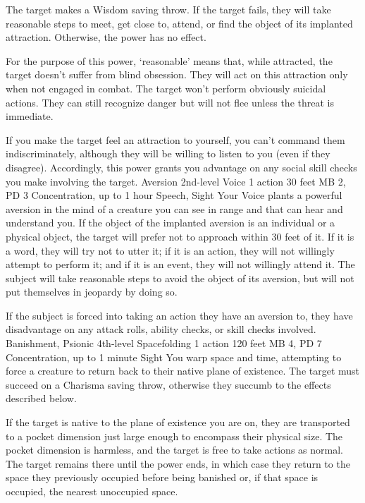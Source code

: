 The target makes a Wisdom saving throw. If the target fails,
they will take reasonable steps to meet, get close to, attend,
or find the object of its implanted attraction. Otherwise,
the power has no effect.

For the purpose of this power, `reasonable' means that, while
attracted, the target doesn't suffer from blind obsession.
They will act on this attraction only when not engaged in
combat. The target won't perform obviously suicidal actions.
They can still recognize danger but will not flee unless the
threat is immediate.

If you make the target feel an attraction to yourself, you
can't command them indiscriminately, although they will be
willing to listen to you (even if they disagree). Accordingly,
this power grants you advantage on any social skill checks
you make involving the target.
\DndPowerHeader%
    {Aversion\label{pwr:aversion}}
    {2nd-level Voice}
    {1 action}
    {30 feet}
    {MB 2, PD 3}
    {Concentration, up to 1 hour}
    {Speech, Sight}
Your Voice plants a powerful aversion in
the mind of a creature you can see in range
and that can hear and understand you. If the object
of the implanted aversion is an individual or a physical object,
the target will prefer not to approach within 30 feet of it.
If it is a word, they will try not to utter it; if it is an
action, they will not willingly attempt to perform it; and
if it is an event, they will not willingly attend it. The
subject will take reasonable steps to avoid the object of
its aversion, but will not put themselves in jeopardy by doing
so.

If the subject is forced into taking an action they have an
aversion to, they have disadvantage on any attack rolls, ability
checks, or skill checks involved.
\DndPowerHeader%
    {Banishment, Psionic\label{pwr:banishment-psionic}}
    {4th-level Spacefolding}
    {1 action}
    {120 feet}
    {MB 4, PD 7}
    {Concentration, up to 1 minute}
    {Sight}
You warp space and time,
attempting to force a creature to return back to their
native plane of existence.
The target must succeed on a Charisma saving throw,
otherwise they succumb to the effects described below.

If the target is native to the plane of existence you are on,
they are transported to a pocket dimension just large enough
to encompass their physical size.
The pocket dimension is harmless,
and the target is free to take actions as normal.
The target remains there until the power ends,
in which case they return to the space they previously occupied
before being banished or, if that space is occupied,
the nearest unoccupied space.

